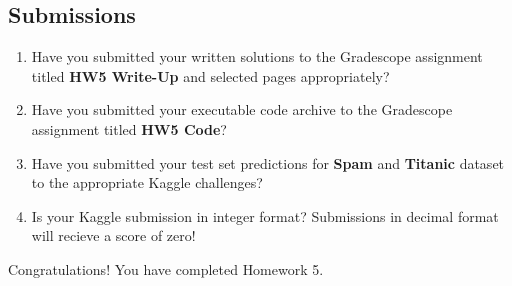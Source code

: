 \documentclass[11pt]{article}
\begin{document}
\subsection*{Submissions}
\begin{enumerate}
    \item Have you submitted your written solutions to the Gradescope assignment titled \textbf{HW5  Write-Up} and selected pages appropriately?
    \item Have you submitted your executable code archive to the Gradescope assignment titled \textbf{HW5 Code}?
    \item Have you submitted your test set predictions for \textbf{Spam} and \textbf{Titanic} dataset to the appropriate Kaggle challenges?
    \item Is your Kaggle submission in integer format? Submissions in decimal format will recieve a score of zero!
\end{enumerate}
Congratulations! You have completed Homework 5.
\end{document}

